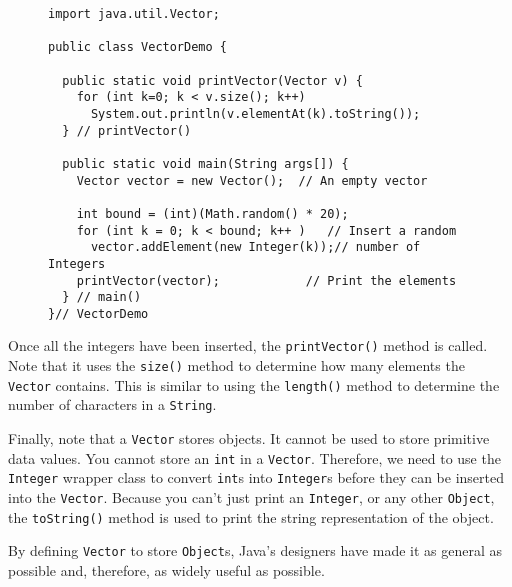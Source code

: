 \begin{figure}[hb]
\jjjprogstart
\begin{jjjlisting}[27pc]
\begin{lstlisting}
import java.util.Vector;

public class VectorDemo {

  public static void printVector(Vector v) {
    for (int k=0; k < v.size(); k++)
      System.out.println(v.elementAt(k).toString());
  } // printVector()

  public static void main(String args[]) {
    Vector vector = new Vector();  // An empty vector

    int bound = (int)(Math.random() * 20);
    for (int k = 0; k < bound; k++ )   // Insert a random
      vector.addElement(new Integer(k));// number of Integers
    printVector(vector);            // Print the elements
  } // main()
}// VectorDemo
\end{lstlisting}
\end{jjjlisting}
\end{figure}

Once all the integers have been inserted, the {\tt printVector()}
method is called.  Note that it uses the {\tt size()} method to
determine how many elements the {\tt Vector} contains.  This is similar
to using the {\tt length()} method to determine the number of
characters in a {\tt String}.

Finally, note that a {\tt Vector} stores objects.  It cannot be used to
store primitive data values.  You cannot store an {\tt int} in a
{\tt Vector}. Therefore, we need to use the {\tt Integer} wrapper class to
convert {\tt int}s into {\tt Integer}s before they can be inserted
into the {\tt Vector}. Because you can't just print an {\tt Integer},
or any other {\tt Object}, the {\tt toString()} method is used to
print the string representation of the object.

By defining {\tt Vector} to store {\tt Object}s, Java's designers have
made it as general as possible and, therefore, as widely useful as 
possible.  



